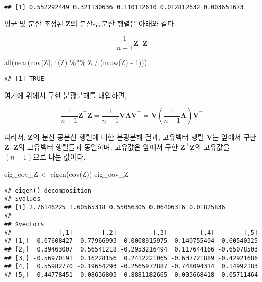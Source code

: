 \documentclass[
]{book}
\newenvironment{Shaded}{\begin{snugshade}}{\end{snugshade}}
\newcommand{\DecValTok}[1]{\textcolor[rgb]{0.00,0.00,0.81}{#1}}
\newcommand{\FunctionTok}[1]{\textcolor[rgb]{0.00,0.00,0.00}{#1}}
\newcommand{\NormalTok}[1]{#1}
\newcommand{\OtherTok}[1]{\textcolor[rgb]{0.56,0.35,0.01}{#1}}
\newcommand{\SpecialCharTok}[1]{\textcolor[rgb]{0.00,0.00,0.00}{#1}}
\begin{document}
\begin{verbatim}
## [1] 0.552292449 0.321130636 0.110112610 0.012812632 0.003651673
\end{verbatim}

평균 및 분산 조정된 \(\mathbf{Z}\)의 분산-공분산 행렬은 아래와 같다.

\[\frac{1}{n - 1} \mathbf{Z}^\top \mathbf{Z}\]

\begin{Shaded}
\begin{Highlighting}[]
\FunctionTok{all}\NormalTok{(}\FunctionTok{near}\NormalTok{(}\FunctionTok{cov}\NormalTok{(Z), }\FunctionTok{t}\NormalTok{(Z) }\SpecialCharTok{\%*\%}\NormalTok{ Z }\SpecialCharTok{/}\NormalTok{ (}\FunctionTok{nrow}\NormalTok{(Z) }\SpecialCharTok{{-}} \DecValTok{1}\NormalTok{)))}
\end{Highlighting}
\end{Shaded}

\begin{verbatim}
## [1] TRUE
\end{verbatim}

여기에 위에서 구한 분광분해를 대입하면,

\[\frac{1}{n - 1} \mathbf{Z}^\top \mathbf{Z} = \frac{1}{n - 1} \mathbf{V} \mathbf{\Lambda} \mathbf{V}^\top =  \mathbf{V} \left( \frac{1}{n - 1} \mathbf{\Lambda} \right) \mathbf{V}^\top\]

따라서, \(\mathbf{Z}\)의 분산-공분산 행렬에 대한 분광분해 결과, 고유벡터 행렬 \(\mathbf{V}\)는 앞에서 구한 \(\mathbf{Z}^\top \mathbf{Z}\)의 고유벡터 행렬들과 동일하며, 고유값은 앞에서 구한 \(\mathbf{Z}^\top \mathbf{Z}\)의 고유값을 \((n - 1)\)으로 나눈 값이다.

\begin{Shaded}
\begin{Highlighting}[]
\NormalTok{eig\_cov\_Z }\OtherTok{\textless{}{-}} \FunctionTok{eigen}\NormalTok{(}\FunctionTok{cov}\NormalTok{(Z))}
\NormalTok{eig\_cov\_Z}
\end{Highlighting}
\end{Shaded}

\begin{verbatim}
## eigen() decomposition
## $values
## [1] 2.76146225 1.60565318 0.55056305 0.06406316 0.01825836
## 
## $vectors
##             [,1]        [,2]          [,3]         [,4]        [,5]
## [1,] -0.07608427  0.77966993  0.0008915975 -0.140755404  0.60540325
## [2,]  0.39463007  0.56541218 -0.2953216494  0.117644166 -0.65078503
## [3,] -0.56970191  0.16228156  0.2412221065 -0.637721889 -0.42921686
## [4,]  0.55982770 -0.19654293 -0.2565972887 -0.748094314  0.14992183
## [5,]  0.44778451  0.08636803  0.8881182665 -0.003668418 -0.05711464
\end{verbatim}
\end{document}

